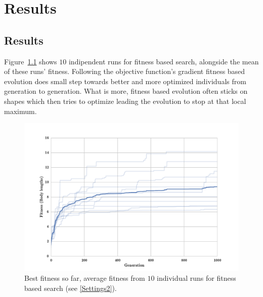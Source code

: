 
\chapter{Results} %

\label{Results} %


\section{Results}

Figure~\ref{fig:indRunsAvgSize10Fitness} shows $10$ indipendent runs for fitness based search, alongside the mean of these runs' fitness. Following the objective function's gradient fitness based evolution does small step towards better and more optimized individuals from generation to generation. What is more, fitness based evolution often sticks on shapes which then tries to optimize leading the evolution to stop at that local maximum.

\begin{figure}[h!]
\centering
\includegraphics[width=1.0\textwidth]{../Figures/Results/indRunsAvgSize10Fitness.pdf}
\caption{Best fitness so far, average fitness from $10$ individual runs for fitness based search (see \ref{Settings2}).}
\label{fig:indRunsAvgSize10Fitness}
\end{figure}

